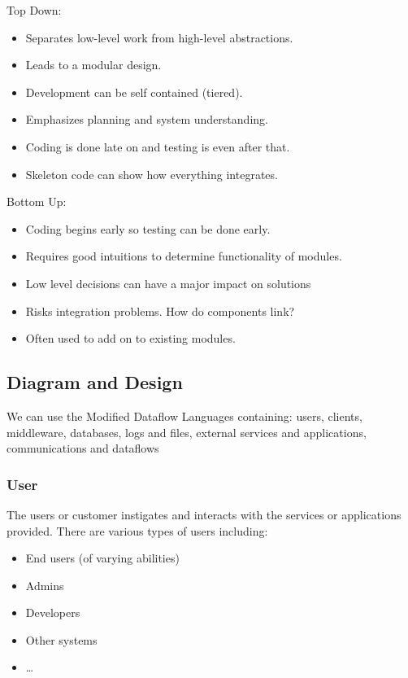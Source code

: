 \begin{minipage}[t]{0.45\linewidth}
	Top Down:
	\begin{itemize}
		\item Separates low-level work from high-level abstractions.
		\item Leads to a modular design.
		\item Development can be self contained (tiered).
		\item Emphasizes planning and system understanding.
		\item Coding is done late on and testing is even after that.
		\item Skeleton code can show how everything integrates.
	\end{itemize}
\end{minipage}
\hfill
\begin{minipage}[t]{0.45\linewidth}
	Bottom Up:
	\begin{itemize}
		\item Coding begins early so testing can be done early.
		\item Requires good intuitions to determine functionality of modules.
		\item Low level decisions can have a major impact on solutions
		\item Risks integration problems. How do components link?
		\item Often used to add on to existing modules.
	\end{itemize}
\end{minipage}

\subsection{Diagram and Design}\label{sub:diagram_and_design}

We can use the Modified Dataflow Languages containing: users, clients, middleware, databases, logs and files, external services and applications, communications and dataflows

\subsubsection{User}\label{ssub:user}

The users or customer instigates and interacts with the services or applications provided.
There are various types of users including:
\begin{itemize}
	\item End users (of varying abilities)
	\item Admins
	\item Developers
	\item Other systems
	\item \dots
\end{itemize}

